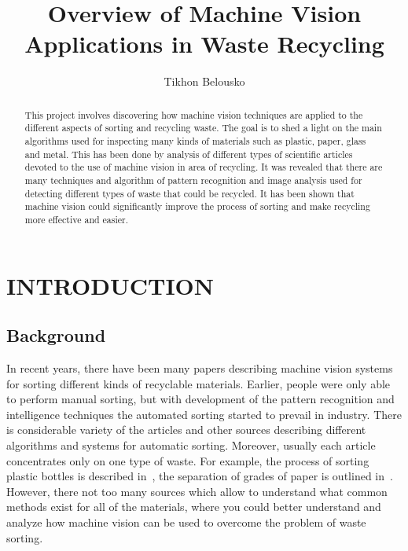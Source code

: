 \documentclass{lutmscthesis}[2010/09/22]
\title{Overview of Machine Vision Applications in Waste Recycling}
\author{Tikhon Belousko}
\begin{document}


\maketitle
\newpage


\begin{abstract}

This project involves discovering how machine vision techniques are applied
to the different aspects of sorting and recycling waste. The goal is to shed
a light on the main algorithms used for inspecting many kinds of materials such
as plastic, paper, glass and metal. This has been done by analysis of different
types of scientific articles devoted to the use of machine vision in area of
recycling. It was revealed that there are many techniques and algorithm of
pattern recognition and image analysis used for detecting different types
of waste that could be recycled. It has been shown that machine vision
could significantly improve the process of sorting and make recycling
more effective and easier.

\end{abstract}


\renewcommand\refname{REFERENCES}
\renewcommand\contentsname{CONTENTS}
\newpage

\tableofcontents

\section{ INTRODUCTION }
\setlength{\parskip}{3ex}

\subsection{ Background }
In recent years, there have been many papers describing
machine vision systems for sorting different kinds
of recyclable materials. Earlier, people were only
able to perform manual sorting, but with
development of the pattern recognition and intelligence
techniques the automated sorting started to prevail
in industry. There is considerable variety of the
articles and other sources describing different
algorithms and systems for automatic sorting. Moreover,
usually each article concentrates only on one
type of waste. For example, the process of sorting
plastic bottles is described in~\cite{Wahab:2006}, the
separation of grades of paper is outlined
in~\cite{Rahman2009matching}. However, there not too many
sources which allow to understand what common
methods exist for all of the materials, where
you could better understand and analyze how machine
vision can be used to overcome the problem
of waste sorting.
\end{document}
